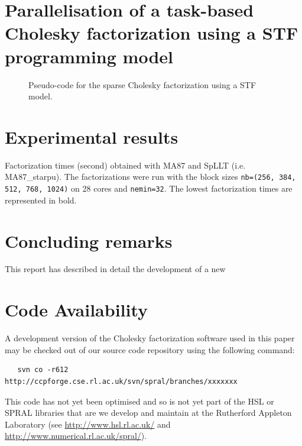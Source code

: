 \documentclass{article}
\begin{document}
\section{Parallelisation of a task-based Cholesky factorization using a STF programming model}
\label{sec:experiments}


\begin{figure}[!h]
  \centering 
\caption{\label{fig:activation-pseudocode-1d}Pseudo-code for the
  sparse Cholesky factorization using a STF model.}
\end{figure}

\section{Experimental results}\label{sec:experiments}

\begin{table}[htbp]
    \begin{center}
      
    \end{center}
    \caption{Factorization times (second) obtained with MA87 and SpLLT
      (i.e. MA87\_starpu). The factorizations were run with the block
      sizes \texttt{nb=(256, 384, 512, 768, 1024)} on 28 cores and
      \texttt{nemin=32}. The lowest factorization times are
      represented in bold.}
\end{table}

\section{Concluding remarks}\label{sec:conclusions}
This report has described in detail the development of a new

 
\section*{Code Availability}
A development version of the Cholesky factorization software used in this 
paper may be checked out of
our source code repository using the following command:

\begin{verbatim}
   svn co -r612 http://ccpforge.cse.rl.ac.uk/svn/spral/branches/xxxxxxx
\end{verbatim}

This code has not yet been optimised and so is not yet
part of the HSL or SPRAL libraries that are we develop
and maintain at the Rutherford Appleton Laboratory (see
\url{http://www.hsl.rl.ac.uk/} and \url{http://www.numerical.rl.ac.uk/spral/}).
\end{document}
